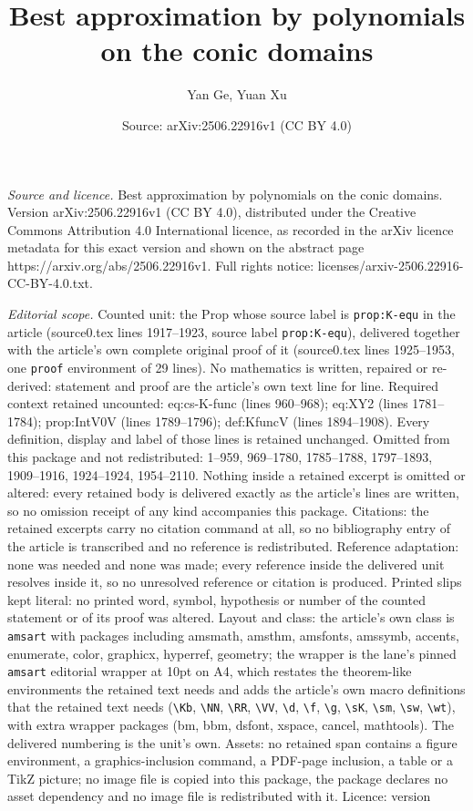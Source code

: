\documentclass[10pt,a4paper]{amsart}
\title[Best approximation by polynomials on the conic domains]{Best approximation by polynomials on the conic domains}
\author{Yan Ge, Yuan Xu}
\date{Source: arXiv:2506.22916v1 (CC BY 4.0)}
\begin{document}
\maketitle

\noindent\emph{Source and licence.} Best approximation by polynomials on the conic domains. Version arXiv:2506.22916v1 (CC BY 4.0), distributed under the Creative Commons Attribution 4.0 International licence, as recorded in the arXiv licence metadata for this exact version and shown on the abstract page https://arxiv.org/abs/2506.22916v1. Full rights notice: licenses/arxiv-2506.22916-CC-BY-4.0.txt.\par\smallskip

\noindent\textit{Editorial scope.} Counted unit: the Prop whose source label is \texttt{prop:K-equ} in the article (source0.tex lines 1917--1923, source label \texttt{prop:K-equ}), delivered together with the article's own complete original proof of it (source0.tex lines 1925--1953, one \texttt{proof} environment of 29 lines). No mathematics is written, repaired or re-derived: statement and proof are the article's own text line for line. Required context retained uncounted: eq:cs-K-func (lines 960--968); eq:XY2 (lines 1781--1784); prop:IntV0V (lines 1789--1796); def:KfuncV (lines 1894--1908). Every definition, display and label of those lines is retained unchanged. Omitted from this package and not redistributed: 1--959, 969--1780, 1785--1788, 1797--1893, 1909--1916, 1924--1924, 1954--2110. Nothing inside a retained excerpt is omitted or altered: every retained body is delivered exactly as the article's lines are written, so no omission receipt of any kind accompanies this package. Citations: the retained excerpts carry no citation command at all, so no bibliography entry of the article is transcribed and no reference is redistributed. Reference adaptation: none was needed and none was made; every reference inside the delivered unit resolves inside it, so no unresolved reference or citation is produced. Printed slips kept literal: no printed word, symbol, hypothesis or number of the counted statement or of its proof was altered. Layout and class: the article's own class is \texttt{amsart} with packages including amsmath, amsthm, amsfonts, amssymb, accents, enumerate, color, graphicx, hyperref, geometry; the wrapper is the lane's pinned \texttt{amsart} editorial wrapper at 10pt on A4, which restates the theorem-like environments the retained text needs and adds the article's own macro definitions that the retained text needs (\texttt{\textbackslash Kb}, \texttt{\textbackslash NN}, \texttt{\textbackslash RR}, \texttt{\textbackslash VV}, \texttt{\textbackslash d}, \texttt{\textbackslash f}, \texttt{\textbackslash g}, \texttt{\textbackslash sK}, \texttt{\textbackslash sm}, \texttt{\textbackslash sw}, \texttt{\textbackslash wt}), with extra wrapper packages (bm, bbm, dsfont, xspace, cancel, mathtools). The delivered numbering is the unit's own. Assets: no retained span contains a figure environment, a graphics-inclusion command, a PDF-page inclusion, a table or a TikZ picture; no image file is copied into this package, the package declares no asset dependency and no image file is redistributed with it. Licence: version 
\end{document}
